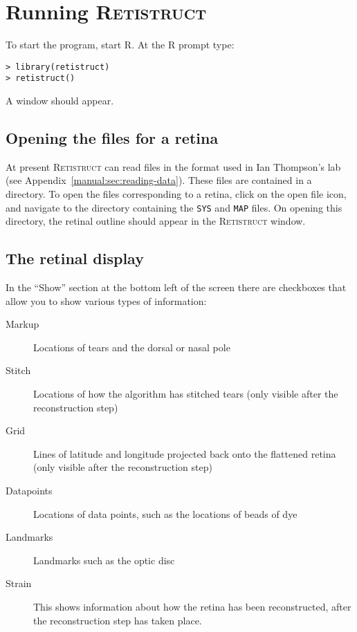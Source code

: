 \documentclass{article}
\begin{document}
\section{Running \textsc{Retistruct}}
\label{manual:sec:running}

To start the program, start \textsc{R}. At the \textsc{R} prompt type:

\begin{verbatim}
> library(retistruct)
> retistruct()
\end{verbatim}
A window should appear.

\subsection{Opening the files for a retina}
\label{manual:sec:opening-files-retina}

At present \textsc{Retistruct} can read files in the format used in
Ian Thompson's lab (see Appendix~\ref{manual:sec:reading-data}). These
files are contained in a directory. To open the files corresponding to
a retina, click on the open file icon, and navigate to the directory
containing the \texttt{SYS} and \texttt{MAP} files. On opening this
directory, the retinal outline should appear in the
\textsc{Retistruct} window.

\subsection{The retinal display}
\label{manual:sec:retinal-display}

In the ``Show'' section at the bottom left of the screen there are
checkboxes that allow you to show various types of information:
\begin{description}
\item[Markup] Locations of tears and the dorsal or nasal pole
\item[Stitch] Locations of how the algorithm has stitched tears (only
  visible after the reconstruction step)
\item[Grid] Lines of latitude and longitude projected back onto the
  flattened retina (only visible after the reconstruction step)
\item[Datapoints] Locations of data points, such as the locations of
  beads of dye
\item[Landmarks] Landmarks such as the optic disc
\item[Strain] This shows information about how the retina has been
  reconstructed, after the reconstruction step has taken place.
\end{description}
\end{document}
